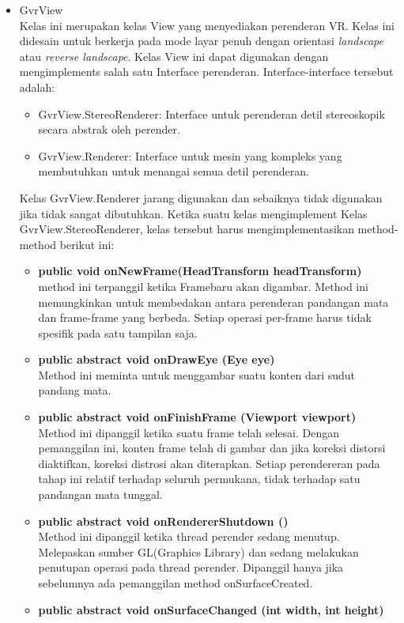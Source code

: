 \begin{itemize}
	\item GvrView\\
	Kelas ini merupakan kelas View yang menyediakan perenderan VR. Kelas ini didesain untuk berkerja pada mode layar penuh dengan orientasi \textit{landscape} atau \textit{reverse landscape}. Kelas View ini dapat digunakan dengan mengimplements salah satu Interface perenderan. Interface-interface tersebut adalah:
	\begin{itemize}
		\item GvrView.StereoRenderer: Interface untuk perenderan detil stereoskopik secara abstrak oleh perender.
		\item GvrView.Renderer: Interface untuk mesin yang kompleks yang membutuhkan untuk menangai semua detil perenderan.
	\end{itemize}
Kelas GvrView.Renderer jarang digunakan dan sebaiknya tidak digunakan jika tidak sangat dibutuhkan.
Ketika suatu kelas mengimplement Kelas GvrView.StereoRenderer, kelas tersebut harus mengimplementasikan method-method berikut ini:
\begin{itemize}
	\item \textbf{public void onNewFrame(HeadTransform headTransform)}\\
	method ini terpanggil ketika Framebaru akan digambar. Method ini memungkinkan untuk membedakan antara perenderan pandangan mata dan frame-frame yang berbeda. Setiap operasi per-frame harus tidak spesifik pada satu tampilan saja.
	\item \textbf{public abstract void onDrawEye (Eye eye)}\\
	Method ini meminta untuk menggambar suatu konten dari sudut pandang mata.
	\item \textbf{public abstract void onFinishFrame (Viewport viewport)}\\
	Method ini dipanggil ketika suatu frame telah selesai. Dengan pemanggilan ini, konten frame telah di gambar dan jika koreksi distorsi diaktifkan, koreksi distrosi akan diterapkan. Setiap perendereran pada tahap ini relatif terhadap seluruh permukana, tidak terhadap satu pandangan mata tunggal. 
	\item \textbf{public abstract void onRendererShutdown ()}\\
	Method ini dipanggil ketika thread perender sedang menutup. Melepaskan sumber GL(Graphics Library) dan sedang melakukan penutupan operasi pada thread perender. Dipanggil hanya jika sebelumnya ada pemanggilan method onSurfaceCreated.
	\item \textbf{public abstract void onSurfaceChanged (int width, int height)}\\

\end{itemize}
\end{itemize}
